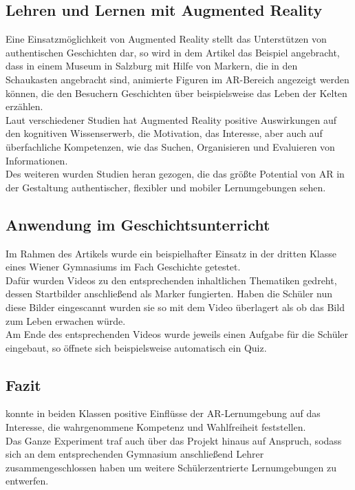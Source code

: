 \subsection{Lehren und Lernen mit Augmented Reality}
Eine Einsatzmöglichkeit von Augmented Reality stellt das Unterstützen von authentischen Geschichten dar, so wird in dem Artikel das Beispiel angebracht, dass in einem Museum in Salzburg mit Hilfe von Markern, die in den Schaukasten angebracht sind, animierte Figuren im AR-Bereich angezeigt werden können, die den Besuchern Geschichten über beispielsweise das Leben der Kelten erzählen. \\
Laut verschiedener Studien hat Augmented Reality positive Auswirkungen auf den kognitiven Wissenserwerb, die Motivation, das Interesse, aber auch auf überfachliche Kompetenzen, wie das Suchen, Organisieren und Evaluieren von Informationen. \\
Des weiteren wurden Studien heran gezogen, die das größte Potential von AR in der Gestaltung authentischer, flexibler und mobiler Lernumgebungen sehen.

\subsection{Anwendung im Geschichtsunterricht}
Im Rahmen des Artikels wurde ein beispielhafter Einsatz in der dritten Klasse eines Wiener Gymnasiums im Fach Geschichte getestet.\\
Dafür wurden Videos zu den entsprechenden inhaltlichen Thematiken gedreht, dessen Startbilder anschließend als Marker fungierten. Haben die Schüler nun diese Bilder eingescannt wurden sie so mit dem Video überlagert als ob das Bild zum Leben erwachen würde. \\
Am Ende des entsprechenden Videos wurde jeweils einen Aufgabe für die Schüler eingebaut, so öffnete sich beispielsweise automatisch ein Quiz.

\subsection{Fazit}
\citeauthor{buchner:ar-geschichtsunterricht} konnte in beiden Klassen positive Einflüsse der AR-Lernumgebung auf das Interesse, die wahrgenommene Kompetenz und Wahlfreiheit feststellen.\\
Das Ganze Experiment traf auch über das Projekt hinaus auf Anspruch, sodass sich an dem entsprechenden Gymnasium anschließend Lehrer zusammengeschlossen haben um weitere Schülerzentrierte Lernumgebungen zu entwerfen.



